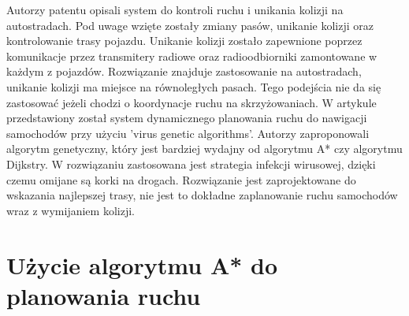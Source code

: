 \newline
\indent
Autorzy patentu \cite{broxmeyer1994vehicle} opisali system do kontroli ruchu i unikania kolizji na autostradach. Pod uwage wzięte zostały zmiany pasów, unikanie kolizji oraz kontrolowanie trasy pojazdu. Unikanie kolizji zostało zapewnione poprzez komunikacje przez transmitery radiowe oraz radioodbiorniki zamontowane w każdym z pojazdów. Rozwiązanie znajduje zastosowanie na autostradach, unikanie kolizji ma miejsce na równoległych pasach. Tego podejścia nie da się zastosować jeżeli chodzi o koordynacje ruchu na skrzyżowaniach.
\newline
\indent
W artykule \cite{kanoh2007dynamic} przedstawiony został system dynamicznego planowania ruchu do nawigacji samochodów przy użyciu 'virus genetic algorithms'. Autorzy zaproponowali algorytm genetyczny, który jest bardziej wydajny od algorytmu A* czy algorytmu Dijkstry. W rozwiązaniu zastosowana jest strategia infekcji wirusowej, dzięki czemu omijane są korki na drogach. Rozwiązanie jest zaprojektowane do wskazania najlepszej trasy, nie jest to dokładne zaplanowanie ruchu samochodów wraz z wymijaniem kolizji.

\section{Użycie algorytmu A* do planowania ruchu}

